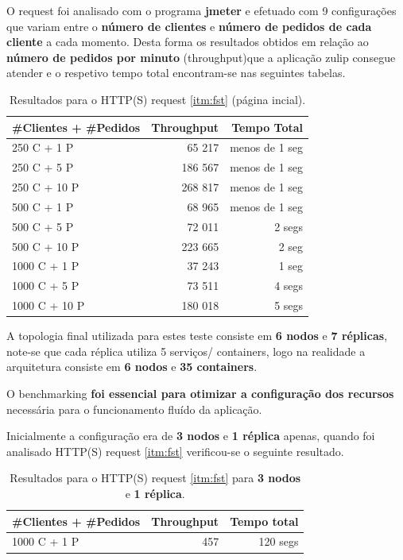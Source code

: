 O request foi analisado com o programa \textbf{jmeter} e efetuado com 9 configurações que variam entre o \textbf{número de clientes} e \textbf{número de pedidos de cada cliente} a cada momento. Desta forma os resultados obtidos em relação ao \textbf{número de pedidos por minuto} (throughput)que a aplicação zulip consegue atender e o respetivo tempo total encontram-se nas seguintes tabelas.

\begin{table}[H]
    \centering
    \begin{tabular}{|l||r||r|}
    \hline
        \#Clientes + \#Pedidos & Throughput & Tempo Total\\ \hline \hline
        250 C + 1 P & 65 217 & menos de 1 seg \\ \hline
        250 C + 5 P & 186 567 & menos de 1 seg \\ \hline
        250 C + 10 P & 268 817 & menos de 1 seg \\ \hline
        \hline
        500 C + 1 P & 68 965 & menos de 1 seg \\ \hline
        500 C + 5 P & 72 011 & 2 segs \\ \hline
        500 C + 10 P & 223 665 & 2 seg \\ \hline
        \hline
        1000 C + 1 P & 37 243 & 1 seg \\ \hline
        1000 C + 5 P & 73 511 & 4 segs \\ \hline
        1000 C + 10 P & 180 018 & 5 segs \\ \hline
        
    \end{tabular}
    \caption{Resultados para o HTTP(S) request \ref{itm:fst} (página incial).}
    \label{tab:testeFront}
\end{table}

A topologia final utilizada para estes teste consiste em \textbf{6 nodos} e \textbf{7 réplicas}, note-se que cada réplica utiliza 5 serviços/ containers, logo na realidade a arquitetura consiste em \textbf{6 nodos} e \textbf{35 containers}.

O benchmarking \textbf{foi essencial para otimizar a configuração dos recursos} necessária para o funcionamento fluído da aplicação. 

Inicialmente a configuração era de \textbf{3 nodos} e \textbf{1 réplica} apenas, quando foi analisado HTTP(S) request \ref{itm:fst} verificou-se o seguinte resultado.

\begin{table}[H]
    \centering
    \begin{tabular}{|l||r||r|}
    \hline
        \#Clientes + \#Pedidos & Throughput & Tempo total \\ \hline \hline
        1000 C + 1 P & 457 & 120 segs \\ \hline
    \end{tabular}
    \caption{Resultados para o HTTP(S) request \ref{itm:fst} para \textbf{3 nodos} e \textbf{1 réplica}.}
    \label{tab:testeFront}
\end{table}

